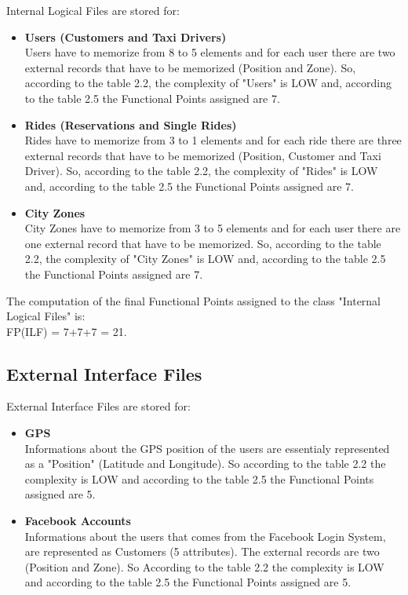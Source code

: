 \documentclass[../../../../projectPlan.tex]{subfiles}
\begin{document}
			Internal Logical Files are stored for:
			\begin{itemize}
				\item \textbf{Users (Customers and Taxi Drivers)} \\
				      Users have to memorize from 8 to 5 elements and for each user there are two external records that have to be memorized (Position and Zone). So, according to the table 2.2, the complexity of "Users" is LOW and, according to the table 2.5 the Functional Points assigned are 7.

				\item \textbf{Rides (Reservations and Single Rides)} \\
				      Rides have to memorize from 3 to 1 elements and for each ride there are three external records that have to be memorized (Position, Customer and Taxi Driver). So, according to the table 2.2, the complexity of "Rides" is LOW and, according to the table 2.5 the Functional Points assigned are 7.

				\item \textbf{City Zones} \\
				      City Zones have to memorize from 3 to 5 elements and for each user there are one external record that have to be memorized. So, according to the table 2.2, the complexity of "City Zones" is LOW and, according to the table 2.5 the Functional Points assigned are 7.
			\end{itemize}

			The computation of the final Functional Points assigned to the class "Internal Logical Files" is:\\
			FP(ILF) = 7+7+7 = 21.


		\subsection{External Interface Files}
			External Interface Files are stored for:
			\begin{itemize}
				\item \textbf{GPS} \\
					   Informations about the GPS position of the users are essentialy represented as a "Position" (Latitude and Longitude). So according to the table 2.2 the complexity is LOW and according to the table 2.5 the Functional Points assigned are 5.

			    \item \textbf{Facebook Accounts}\\
			          Informations about the users that comes from the Facebook Login System, are represented as Customers (5 attributes). The external records are two (Position and Zone). So According to the table 2.2 the complexity is LOW and according to the table 2.5 the Functional Points assigned are 5. 
			\end{itemize}
\end{document}
